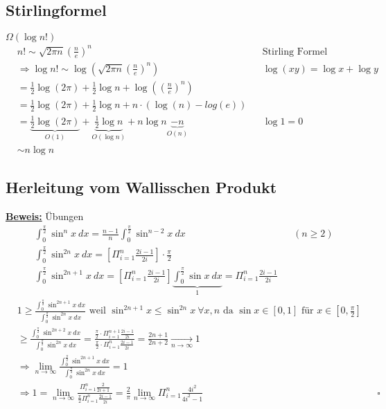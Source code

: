\subsection{Stirlingformel}
$\Omega(\log n!)$\\

\begin{align*}
    &n! \sim \sqrt{2\pi n}(\frac{n}{e})^n &&\text{Stirling Formel}\\
    &\Rightarrow \log n! \sim \log(\sqrt{2\pi n}(\frac{n}{e})^n) && \log (xy) = \log x + \log y\\
    &= {\frac{1}{2}\log(2\pi)} + {\frac{1}{2}\log n} + \log((\frac{n}{e})^n)\\
    &= {\frac{1}{2}\log(2\pi)} + {\frac{1}{2}\log n} + n \cdot (\log(n) - log(e))\\
    &= \underbrace{\frac{1}{2}\log(2\pi)}_{O(1)} + \underbrace{\frac{1}{2}\log n}_{O(\log n)} + n \log n \underbrace{- n}_{O(n)} && \log 1 = 0\\
    &\sim n \log n
\end{align*}


\subsection{Herleitung vom Wallisschen Produkt}
\underline{\textbf{Beweis:}} Übungen
\renewcommand{\intpihalbe}{\int_{0}^{\frac{\pi}{2}}}
\begin{align*}
    &\int_{0}^{\frac{\pi}{2}} \sin^{n} x\ dx = \frac{n-1}{n} \int_{0}^{\frac{\pi}{2}} \sin^{n -2} x \ dx && (n \geq 2)\\
    &\intpihalbe \sin^{2n} x \ dx = \left[\Pi_{i=1}^{n} \frac{2i -1}{2i}\right] \cdot \frac{\pi}{2}\\
    &\intpihalbe \sin^{2n+1} x \ dx = \left[\Pi_{i=1}^{n} \frac{2i -1}{2i}\right] \underbrace{\intpihalbe \sin x \ dx}_{1} = \Pi_{i=1}^{n} \frac{2i -1}{2i}
\end{align*}
\begin{align*}
    &1 \geq \frac{\intpihalbe \sin^{2n+1} x \ dx}{\intpihalbe \sin^{2n} x \ dx} \text{ weil } \sin^{2n+1} x \leq \sin^{2n} x \ \forall x, n \text{ da } \sin x \in [0, 1] \text{ für } x \in [0, \frac{\pi}{2}]\\
    &\geq \frac{\intpihalbe \sin^{2n+2} x \ dx}{\intpihalbe \sin^{2n} x \ dx} = \frac{\frac{\pi}{2} \cdot \Pi_{i = 1}^{n+1} \frac{2i-1}{2i}}{\frac{\pi}{2} \cdot \Pi_{i = 1}^{n} \frac{2i-1}{2i}} = \frac{2n +1}{2n+2} \underset{n \rightarrow \infty}{\longrightarrow} 1\\
    &\Rightarrow \lim_{n \rightarrow \infty} \frac{\intpihalbe \sin^{2n+1} x \ dx}{\intpihalbe \sin^{2n} x \ dx} = 1\\
    &\Rightarrow 1 = \lim_{n \rightarrow \infty} \frac{\Pi_{i = 1}^{n} \frac{2}{2i+1}}{\frac{\pi}{2} \Pi_{i = 1}^{n} \frac{2i-1}{2i}} = \frac{2}{\pi} \lim_{n \rightarrow \infty} \Pi_{i = 1}^{n} \frac{4i^2}{4i^2 -1} && \square
\end{align*}
\newpage
